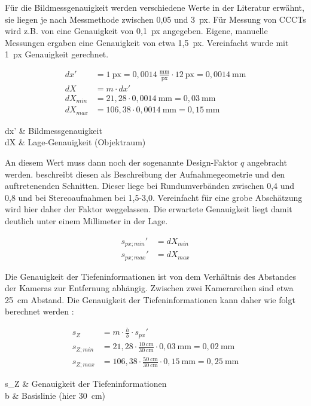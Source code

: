 \documentclass[./00PhotoBox.tex]{subfiles}
\begin{document}
Für die Bildmessgenauigkeit werden verschiedene Werte in der Literatur erwähnt, sie liegen je nach Messmethode zwischen 0,05 und 3~px. Für Messung von CCCTs wird z.B. von \cite{soot2015} eine Genauigkeit von 0,1~px angegeben.
Eigene, manuelle Messungen ergaben eine Genauigkeit von etwa 1,5~px. Vereinfacht wurde mit 1~px Genauigkeit gerechnet.

\begin{align}
    dx'      & = 1~\text{px} = 0,0014~\frac{\text{mm}}{\text{px}} \cdot 12~\text{px} = 0,0014~\text{mm} \\
    dX       & = m \cdot dx'                                                                            \\
    dX_{min} & = 21,28 \cdot 0,0014~\text{mm} = 0,03~\text{mm}                                          \\
    dX_{max} & = 106,38 \cdot 0,0014~\text{mm} = 0,15~\text{mm}
\end{align}
\begin{conditions}
    dx' & Bildmessgenauigkeit \\
    dX  & Lage-Genauigkeit (Objektraum)
\end{conditions}

An diesem Wert muss dann noch der sogenannte Design-Faktor $q$ angebracht werden. \cite[S. 174]{luhmann} beschreibt diesen als Beschreibung der Aufnahmegeometrie und den auftretenenden Schnitten. Dieser liege bei Rundumverbänden zwischen 0,4 und 0,8 und bei Stereoaufnahmen bei 1,5-3,0. Vereinfacht für eine grobe Abschätzung wird hier daher der Faktor weggelassen. Die erwartete Genauigkeit liegt damit deutlich unter einem Millimeter in der Lage.

\begin{align}
    s_{px; min}' & = dX_{min} \\
    s_{px; max}' & = dX_{max}
\end{align}

Die Genauigkeit der Tiefeninformationen ist von dem Verhältnis des Abstandes der Kameras zur Entfernung abhängig. Zwischen zwei Kamerareihen sind etwa 25~cm Abstand. Die Genauigkeit der Tiefeninformationen kann daher wie folgt berechnet werden \citep[S. 174]{luhmann}:

\begin{align}
    s_Z       & = m \cdot \frac{h}{b} \cdot s_{px}'                                                    \\
    s_{Z;min} & = 21,28 \cdot \frac{10~\text{cm}}{30~\text{cm}}\cdot 0,03~\text{mm}  = 0,02~\text{mm}  \\
    s_{Z;max} & = 106,38 \cdot \frac{50~\text{cm}}{30~\text{cm}} \cdot 0,15~\text{mm} = 0,25~\text{mm}
\end{align}
\begin{conditions}
    s_Z & Genauigkeit der Tiefeninformationen \\
    b   & Basislinie (hier 30~cm)
\end{conditions}
\end{document}
